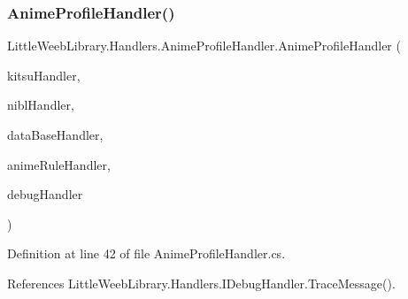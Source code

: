 \subsubsection{\texorpdfstring{Anime\+Profile\+Handler()}{AnimeProfileHandler()}}
{\footnotesize\ttfamily Little\+Weeb\+Library.\+Handlers.\+Anime\+Profile\+Handler.\+Anime\+Profile\+Handler (\begin{DoxyParamCaption}\item[{\mbox{\hyperlink{interface_little_weeb_library_1_1_handlers_1_1_i_kitsu_handler}{I\+Kitsu\+Handler}}}]{kitsu\+Handler,  }\item[{\mbox{\hyperlink{interface_little_weeb_library_1_1_handlers_1_1_i_nibl_handler}{I\+Nibl\+Handler}}}]{nibl\+Handler,  }\item[{\mbox{\hyperlink{interface_little_weeb_library_1_1_handlers_1_1_i_data_base_handler}{I\+Data\+Base\+Handler}}}]{data\+Base\+Handler,  }\item[{\mbox{\hyperlink{interface_little_weeb_library_1_1_handlers_1_1_i_anime_rule_handler}{I\+Anime\+Rule\+Handler}}}]{anime\+Rule\+Handler,  }\item[{\mbox{\hyperlink{interface_little_weeb_library_1_1_handlers_1_1_i_debug_handler}{I\+Debug\+Handler}}}]{debug\+Handler }\end{DoxyParamCaption})}



Definition at line 42 of file Anime\+Profile\+Handler.\+cs.



References Little\+Weeb\+Library.\+Handlers.\+I\+Debug\+Handler.\+Trace\+Message().


